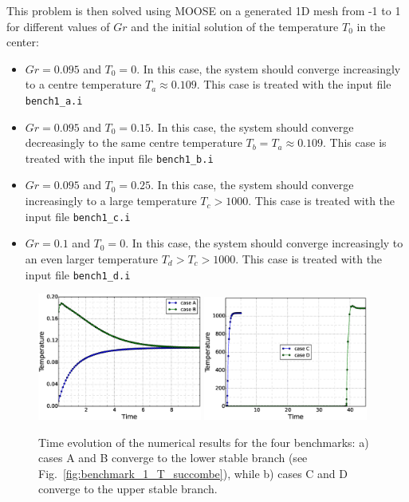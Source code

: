\documentclass[]{scrreprt}
\newcommand{\moose}{{MOOSE}}
\begin{document}
This problem is then solved using \moose{} on a generated 1D mesh from -1 to 1 for different values of $Gr$ and the initial solution of the temperature $T_0$ in the center:
\begin{itemize}
\item $Gr=0.095$ and $T_0=0$. In this case, the system should converge increasingly to a centre temperature $T_a\approx0.109$. This case is treated with the input file \texttt{bench1\_a.i} 
\item $Gr=0.095$ and $T_0=0.15$. In this case, the system should converge decreasingly to the same centre temperature $T_b=T_a\approx0.109$. This case is treated with the input file \texttt{bench1\_b.i} 
\item $Gr=0.095$ and $T_0=0.25$. In this case, the system should converge increasingly to a large temperature $T_c>1000$. This case is treated with the input file \texttt{bench1\_c.i} 
\item $Gr=0.1$ and $T_0=0$. In this case, the system should converge increasingly to an even larger temperature $T_d>T_c>1000$. This case is treated with the input file \texttt{bench1\_d.i} 
\end{itemize}

\begin{figure}
  \centering
  \includegraphics[width=0.48\textwidth]{benchmark_1_T/benchmark_1_T_results_A_B.eps}
  \includegraphics[width=0.48\textwidth]{benchmark_1_T/benchmark_1_T_results_C_D.eps}
  \caption{Time evolution of the numerical results for the four benchmarks: a) cases A and B converge to the lower stable branch (see Fig.~\ref{fig:benchmark_1_T_succombe}), while b) cases C and D converge to the upper stable branch.}
  \label{fig:benchmark_1_T_results}
\end{figure}
\end{document}

